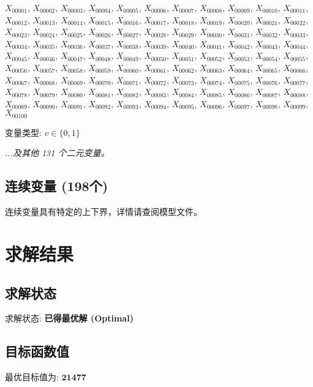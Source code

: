 \documentclass[a4paper,10pt]{article}
\begin{document}
{\small $X_{00001}$, $X_{00002}$, $X_{00003}$, $X_{00004}$, $X_{00005}$, $X_{00006}$, $X_{00007}$, $X_{00008}$, $X_{00009}$, $X_{00010}$, $X_{00011}$, $X_{00012}$, $X_{00013}$, $X_{00014}$, $X_{00015}$, $X_{00016}$, $X_{00017}$, $X_{00018}$, $X_{00019}$, $X_{00020}$, $X_{00021}$, $X_{00022}$, $X_{00023}$, $X_{00024}$, $X_{00025}$, $X_{00026}$, $X_{00027}$, $X_{00028}$, $X_{00029}$, $X_{00030}$, $X_{00031}$, $X_{00032}$, $X_{00033}$, $X_{00034}$, $X_{00035}$, $X_{00036}$, $X_{00037}$, $X_{00038}$, $X_{00039}$, $X_{00040}$, $X_{00041}$, $X_{00042}$, $X_{00043}$, $X_{00044}$, $X_{00045}$, $X_{00046}$, $X_{00047}$, $X_{00048}$, $X_{00049}$, $X_{00050}$, $X_{00051}$, $X_{00052}$, $X_{00053}$, $X_{00054}$, $X_{00055}$, $X_{00056}$, $X_{00057}$, $X_{00058}$, $X_{00059}$, $X_{00060}$, $X_{00061}$, $X_{00062}$, $X_{00063}$, $X_{00064}$, $X_{00065}$, $X_{00066}$, $X_{00067}$, $X_{00068}$, $X_{00069}$, $X_{00070}$, $X_{00071}$, $X_{00072}$, $X_{00073}$, $X_{00074}$, $X_{00075}$, $X_{00076}$, $X_{00077}$, $X_{00078}$, $X_{00079}$, $X_{00080}$, $X_{00081}$, $X_{00082}$, $X_{00083}$, $X_{00084}$, $X_{00085}$, $X_{00086}$, $X_{00087}$, $X_{00088}$, $X_{00089}$, $X_{00090}$, $X_{00091}$, $X_{00092}$, $X_{00093}$, $X_{00094}$, $X_{00095}$, $X_{00096}$, $X_{00097}$, $X_{00098}$, $X_{00099}$, $X_{00100}$}

变量类型: $v \in \{0,1\}$

\textit{...及其他 131 个二元变量。}

\subsection{连续变量 (198个)}

连续变量具有特定的上下界，详情请查阅模型文件。

\section{求解结果}

\subsection{求解状态}

求解状态: \textbf{已得最优解 (Optimal)}

\subsection{目标函数值}

最优目标值为: $\mathbf{21477}$
\end{document}
